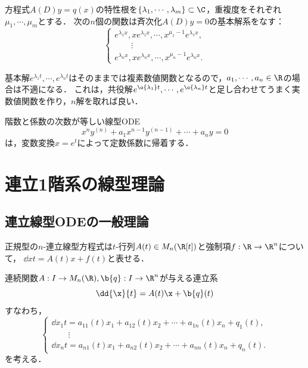 \documentclass[uplatex,dvipdfmx]{jsreport}
\begin{document}
\begin{theorem}[定数係数線型ODEの基本解]
    方程式$A(D)y=q(x)$の特性根を$\{\lambda_1,\cdots,\lambda_m\}\subset\C$，重複度をそれぞれ$\mu_1,\cdots,\mu_m$とする．
    次の$n$個の関数は斉次化$A(D)y=0$の基本解系をなす：
    \[\begin{cases}
        e^{\lambda_1x},xe^{\lambda_1x},\cdots,x^{\mu_1-1}e^{\lambda_1x},\\
        \qquad\vdots\\
        e^{\lambda_nx},xe^{\lambda_nx},\cdots,x^{\mu_n-1}e^{\lambda_nx}.
    \end{cases}\]
\end{theorem}

\begin{remark}[特性多項式が複素根を持つとき]
    基本解$e^{\lambda_1t},\cdots,e^{\lambda_nt}$はそのままでは複素数値関数となるので，$a_1,\cdots,a_n\in\R$の場合は不適になる．
    これは，共役解$e^{\o{\lambda_1}t},\cdots,e^{\o{\lambda_n}t}$と足し合わせてうまく実数値関数を作り，$n$解を取れば良い．
\end{remark}

\begin{example}
    階数と係数の次数が等しい線型ODE
    \[x^ny^{(n)}+a_1x^{n-1}y^{(n-1)}+\cdots+a_ny=0\]
    は，変数変換$x=e^t$によって定数係数に帰着する．
\end{example}

\section{連立1階系の線型理論}

\subsection{連立線型ODEの一般理論}

\begin{tcolorbox}[colframe=ForestGreen, colback=ForestGreen!10!white,breakable,colbacktitle=ForestGreen!40!white,coltitle=black,fonttitle=\bfseries\sffamily,
title=]
    正規型の$n$-連立線型方程式は$t$-行列$A(t)\in M_n(\R[t])$と強制項$f:\R\to\R^n$について，
    $\dd{x}{t}=A(t)x+f(t)$と表せる．
\end{tcolorbox}

\begin{problem}\label{prob-linear-1st-order-system}
    連続関数$A:I\to M_n(\R),\b{q}:I\to\R^n$が与える連立系
    \[\dd{\x}{t}=A(t)\x+\b{q}(t)\]
    すなわち，
    \[\begin{cases}
        \dd{x_1}{t}=a_{11}(t)x_1+a_{12}(t)x_2+\cdots+a_{1n}(t)x_n+q_1(t),\\
        \qquad\vdots\\
        \dd{x_n}{t}=a_{n1}(t)x_1+a_{n2}(t)x_2+\cdots+a_{nn}(t)x_n+q_n(t).
    \end{cases}\]
    を考える．
\end{problem}
\end{document}
